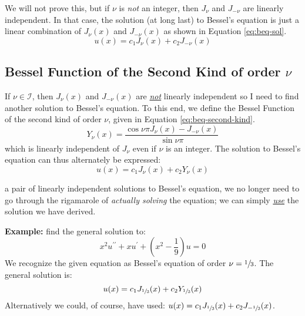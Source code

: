 We will not prove this, but if $\nu$ is \emph{not} an integer, then $J_{\nu}$ and $J_{-\nu}$ are linearly independent. In that case, the solution (at long last) to Bessel's equation is just a linear combination of $J_{\nu}(x)$ and $J_{-\nu}(x)$ as shown in Equation \ref{eq:beq-sol}.
\begin{equation}
u(x) = c_1J_{\nu}(x) + c_2J_{-\nu}(x)
\label{eq:beq-sol}
\end{equation}

\subsection{Bessel Function of the Second Kind of order $\nu$}
If $\nu \in \mathcal{I}$, then $J_{\nu}(x)$ and $J_{-\nu}(x)$ are \emph{\underline{not}} linearly independent so I need to find another solution to Bessel's equation.  To this end, we define the Bessel Function of the second kind of order $\nu$, given in Equation \ref{eq:beq-second-kind}.
\begin{equation}
Y_{\nu}(x) = \frac{\cos{\nu \pi} J_{\nu}(x) - J_{-\nu}(x)}{\sin{\nu \pi}}
\label{eq:beq-second-kind}
\end{equation}
which is linearly independent of $J_{\nu}$ even if $\nu$ is an integer.  The solution to Bessel's equation can thus alternately be expressed:
\begin{equation*}
u(x) = c_1J_{\nu}(x) + c_2Y_{\nu}(x)
\end{equation*}

 a pair of linearly independent solutions to Bessel's equation, we no longer need to go through the rigamarole of \emph{actually solving} the equation; we can simply \emph{\underline{use}} the solution we have derived.

\vspace{1.0cm}

\noindent\textbf{Example:} find the general solution to:
\begin{equation*}
x^2u^{\prime \prime} + xu^{\prime} + \left(x^2 - \frac{1}{9} \right)u = 0
\end{equation*}
We recognize the given equation as Bessel's equation of order $\nu = \sfrac{1}{3}$.  The general solution is: 
\begin{equation*}
u(x) = c_1J_{\sfrac{1}{3}}(x) + c_2Y_{\sfrac{1}{3}}(x)
\end{equation*}
Alternatively we could, of course, have used: $u(x) = c_1J_{\sfrac{1}{3}}(x) + c_2J_{-\sfrac{1}{3}}(x)$.

